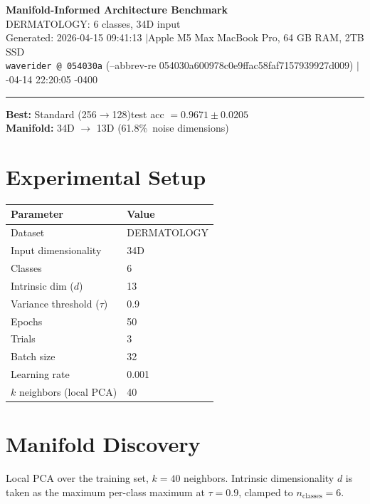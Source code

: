 \documentclass[11pt,letterpaper]{article}
\begin{document}
\begin{center}
  {\LARGE\bfseries\color{wavblue} Manifold-Informed Architecture Benchmark}\\[6pt]
  {\large DERMATOLOGY: 6 classes, 34D input}\\[8pt]
  {\small Generated: 2026-04-15 09:41:13 \quad$|$\quad Apple M5 Max MacBook Pro, 64 GB RAM, 2TB SSD}\\[2pt]
  {\small\texttt{waverider @ 054030a} (--abbrev-re
054030a600978c0e9ffac58faf7157939927d009) \quad$|$-04-14 22:20:05 -0400}
\end{center}
{\color{wavblue}\noindent\rule{\linewidth}{1.5pt}}
\medskip

\noindent\colorbox{wavlight}{\parbox{\dimexpr\linewidth-2\fboxsep\relax}{
  \smallskip
  \textbf{Best:} Standard (256$\rightarrow$128)\quad test acc $= 0.9671 \pm 0.0205$\\[2pt]
  \textbf{Manifold:} 34D $\rightarrow$ 13D (61.8\%\ noise dimensions)\\[2pt]
  \smallskip
}}
\bigskip

\section{Experimental Setup}

\begin{tabular}{@{}ll@{}}
\toprule
\textbf{Parameter} & \textbf{Value} \\
\midrule
  Dataset & DERMATOLOGY \\
  Input dimensionality & 34D \\
  Classes & 6 \\
  Intrinsic dim ($d$) & 13 \\
  Variance threshold ($\tau$) & 0.9 \\
  Epochs & 50 \\
  Trials & 3 \\
  Batch size & 32 \\
  Learning rate & 0.001 \\
  $k$ neighbors (local PCA) & 40 \\
\bottomrule
\end{tabular}

\section{Manifold Discovery}

Local PCA over the training set, $k = 40$ neighbors. Intrinsic dimensionality $d$ is taken as the maximum per-class maximum at $\tau = 0.9$, clamped to $n_{\mathrm{classes}} = 6$.
\end{document}
